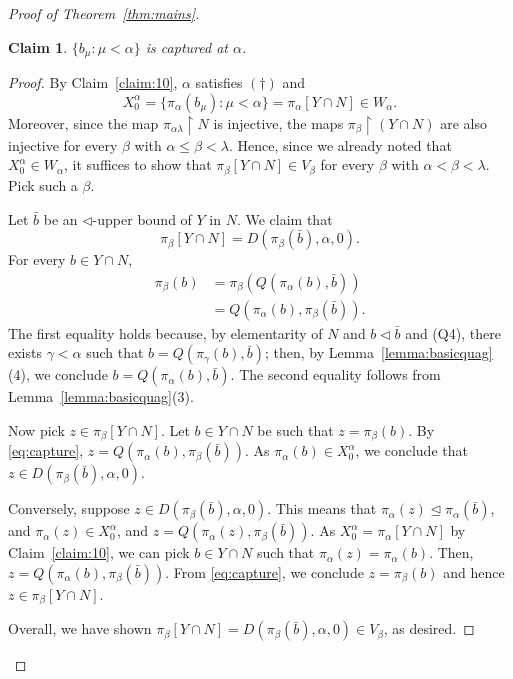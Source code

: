 \documentclass[]{amsart}
\newtheorem{claim}{Claim}[theorem]
\theoremstyle{definition}
\theoremstyle{remark}
\begin{document}
\begin{proof}[Proof of Theorem~\ref{thm:mains}]
\begin{claim}\label{claim:11}
$\{b_\mu : \mu < \alpha\}$ is captured at $\alpha$. 
\end{claim}
\begin{proof}
By Claim~\ref{claim:10}, $\alpha$ satisfies $(\dagger)$ and 
\[
X^\alpha_0 = \{\pi_\alpha(b_\mu) : \mu < \alpha\} = \pi_\alpha[Y \cap N] \in W_\alpha.
\] 
Moreover, since the map $\pi_{\alpha \lambda} \upharpoonright  N$ is injective, the maps $\pi_\beta \upharpoonright (Y \cap N)$ are also injective for every $\beta$ with $\alpha \le \beta < \lambda$. Hence, since we already noted that $X^\alpha_0 \in W_\alpha$,  it suffices to show that $\pi_\beta[Y \cap N] \in V_\beta$ for every $\beta$ with $\alpha < \beta < \lambda$. Pick such a $\beta$.

Let $\bar{b}$ be an $\lhd$-upper bound of $Y$ in $N$. We claim that 
\[
\pi_\beta[Y \cap N] = D(\pi_\beta(\bar{b}), \alpha, 0).
\]
 For every $b \in Y \cap N$,
\begin{equation}\label{eq:capture}
\begin{split}
\pi_\beta(b) &= \pi_\beta(Q(\pi_\alpha(b), \bar{b}))\\&= Q(\pi_\alpha(b), \pi_\beta(\bar{b})).
\end{split}
\end{equation}
The first equality holds because, by elementarity of $N$ and $b \lhd \bar{b}$ and (Q4), there exists $\gamma < \alpha$ such that $b = Q(\pi_\gamma(b), \bar{b})$; then, by Lemma~\ref{lemma:basicquag}(4), we conclude $b = Q(\pi_\alpha(b), \bar{b})$. The second equality follows from Lemma~\ref{lemma:basicquag}(3). 

Now pick $z \in \pi_\beta[Y \cap N]$. Let $b \in Y \cap N$ be such that $z = \pi_\beta(b)$. By \eqref{eq:capture}, $z = Q(\pi_\alpha(b), \pi_\beta(\bar{b}))$. As $\pi_\alpha(b) \in X^\alpha_0$, we conclude that $z \in D(\pi_\beta(\bar{b}), \alpha, 0)$.

Conversely, suppose $z \in D(\pi_\beta(\bar{b}), \alpha, 0)$. This means that $\pi_\alpha(z) \trianglelefteq \pi_\alpha(\bar{b})$, and $\pi_\alpha(z) \in X^\alpha_0$, and $z = Q(\pi_\alpha(z), \pi_\beta(\bar{b}))$. As $X^\alpha_0 = \pi_\alpha[Y \cap N]$ by Claim~\ref{claim:10}, we can pick $b \in Y \cap N$ such that $\pi_\alpha(z) = \pi_\alpha(b)$. Then, $z = Q(\pi_\alpha(b), \pi_\beta(\bar{b}))$. From \eqref{eq:capture}, we conclude $z = \pi_\beta(b)$ and hence $z \in \pi_\beta[Y \cap N]$. 

Overall, we have shown $\pi_\beta[Y \cap N] = D(\pi_\beta(\bar{b}), \alpha, 0) \in V_\beta$, as desired.
\end{proof}




\end{proof}
\end{document}
